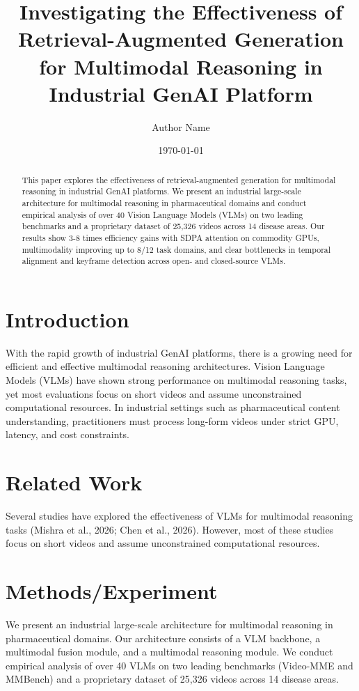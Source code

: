 \documentclass{article}
\begin{document}
        \title{Investigating the Effectiveness of Retrieval-Augmented Generation for Multimodal Reasoning in Industrial GenAI Platform}

        \author{Author Name}
        \date{\today}

        \maketitle

        \begin{abstract}
        This paper explores the effectiveness of retrieval-augmented generation for multimodal reasoning in industrial GenAI platforms. We present an industrial large-scale architecture for multimodal reasoning in pharmaceutical domains and conduct empirical analysis of over 40 Vision Language Models (VLMs) on two leading benchmarks and a proprietary dataset of 25,326 videos across 14 disease areas. Our results show 3-8 times efficiency gains with SDPA attention on commodity GPUs, multimodality improving up to 8/12 task domains, and clear bottlenecks in temporal alignment and keyframe detection across open- and closed-source VLMs.
        \end{abstract}

        \section{Introduction}
        With the rapid growth of industrial GenAI platforms, there is a growing need for efficient and effective multimodal reasoning architectures. Vision Language Models (VLMs) have shown strong performance on multimodal reasoning tasks, yet most evaluations focus on short videos and assume unconstrained computational resources. In industrial settings such as pharmaceutical content understanding, practitioners must process long-form videos under strict GPU, latency, and cost constraints.

        \section{Related Work}
        Several studies have explored the effectiveness of VLMs for multimodal reasoning tasks (Mishra et al., 2026; Chen et al., 2026). However, most of these studies focus on short videos and assume unconstrained computational resources.

        \section{Methods/Experiment}
        We present an industrial large-scale architecture for multimodal reasoning in pharmaceutical domains. Our architecture consists of a VLM backbone, a multimodal fusion module, and a multimodal reasoning module. We conduct empirical analysis of over 40 VLMs on two leading benchmarks (Video-MME and MMBench) and a proprietary dataset of 25,326 videos across 14 disease areas.
\end{document}

